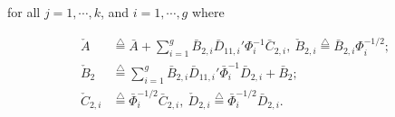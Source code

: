\documentclass[twocolumn]{autart}
\newcommand{\eqdef}{\stackrel{\triangle}{=}}
\begin{document}
for all $j=1,\cdots, k$, and $i=1,\cdots,g$ where
\begin{small}
\begin{equation}
\label{eqdefAbreve}
\begin{split}
\check{A}&\eqdef \bar{A}+\sum_{i=1}^g \bar{B}_{2,i}\bar{D}_{11,i}'\Phi_i^{-1} \bar{C}_{2,i},~\check{B}_{2,i}\eqdef \bar{B}_{2,i}\Phi_i^{-1/2};\\
\check{B}_{2}&\eqdef \sum_{i=1}^g \bar{B}_{2,i}\bar{D}_{11,i}'\bar{\Phi}_i^{-1} \bar{D}_{2,i}+\bar{B}_{2};\\
\check{C}_{2,i}& \eqdef \bar{\Phi}_i^{-1/2}\bar{C}_{2,i},~\check{D}_{2,i} \eqdef \bar{\Phi}_i^{-1/2}\bar{D}_{2,i}.\\
\end{split}
\end{equation}
\end{small}
\end{document}
